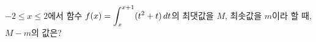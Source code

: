 $-2\le x\le 2$에서 함수 $f(x)=\displaystyle\int_{x}^{x+1} (t^2+t)\mkern3mu dt$의 최댓값을 $M$, 최솟값을 $m$이라 할 때, $M-m$의 값은?
